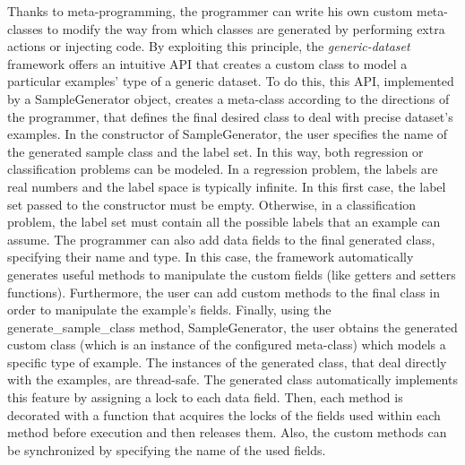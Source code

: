 Thanks to meta-programming, the programmer can write his own custom meta-classes to modify the way from which classes are generated by performing extra actions or injecting code. By exploiting this principle, the \textit{generic-dataset} framework offers an intuitive API that creates a custom class to model a particular examples' type of a generic dataset. To do this, this API, implemented by a \textsf{SampleGenerator} object, creates a meta-class according to the directions of the programmer, that defines the final desired class to deal with precise dataset's examples. In the constructor of \textsf{SampleGenerator}, the user specifies the name of the generated sample class and the label set. In this way, both regression or classification problems can be modeled. In a regression problem, the labels are real numbers and the label space is typically infinite. In this first case, the label set passed to the constructor must be empty. Otherwise, in a classification problem, the label set must contain all the possible labels that an example can assume. The programmer can also add data fields to the final generated class, specifying their name and type. In this case, the framework automatically generates useful methods to manipulate the custom fields (like getters and setters functions). Furthermore, the user can add custom methods to the final class in order to manipulate the example's fields. Finally, using the \textsf{generate\_sample\_class} method, \textsf{SampleGenerator}, the user obtains the generated custom class (which is an instance of the configured meta-class) which models a specific type of example. The instances of the generated class, that deal directly with the examples, are thread-safe. The generated class automatically implements this feature by assigning a lock to each data field. Then, each method is decorated with a function that acquires the locks of the fields used within each method before execution and then releases them. Also, the custom methods can be synchronized by specifying the name of the used fields.

